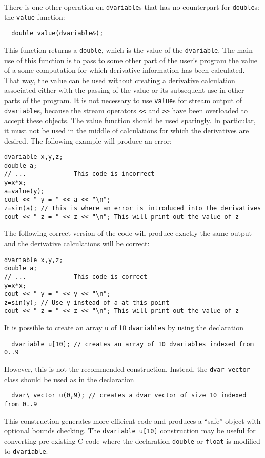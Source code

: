 \documentclass{admbmanual}
\begin{document}
There is one other operation on \texttt{dvariable}s that has no counterpart for
\texttt{double}s: the
\texttt{value} function:
\begin{lstlisting}
  double value(dvariable&);
\end{lstlisting}
\noindent This function returns a \texttt{double}, which is the value of the
\texttt{dvariable}. The main use of this function is to pass to some other part
of the user's program the value of a some computation for which derivative
information has been calculated. That way, the value can be used without
creating a derivative calculation associated either with the passing of the
value or its subsequent use in other parts of the program. It is not necessary
to use \texttt{value}s for stream output of \texttt{dvariable}s, because the
stream operators \texttt{<{}<} and \texttt{>{}>} have been overloaded to accept
these objects. The value function should be used sparingly. In particular, it
must not be used in the middle of calculations for which the derivatives are
desired. The following example will produce an error:
\begin{lstlisting}
dvariable x,y,z;
double a;
// ...             This code is incorrect
y=x*x;
a=value(y);
cout << " y = " << a << "\n";
z=sin(a); // This is where an error is introduced into the derivatives
cout << " z = " << z << "\n"; This will print out the value of z
\end{lstlisting}

The following correct version of the code will produce exactly the same output
and the derivative calculations will be correct:
\begin{lstlisting}
dvariable x,y,z;
double a;
// ...             This code is correct
y=x*x;
cout << " y = " << y << "\n";
z=sin(y); // Use y instead of a at this point
cout << " z = " << z << "\n"; This will print out the value of z
\end{lstlisting}

It is possible to create an array \texttt{u} of 10 \texttt{dvariables} by using
the declaration 
\begin{lstlisting}
  dvariable u[10]; // creates an array of 10 dvariables indexed from 0..9
\end{lstlisting}

However, this is not the recommended construction. Instead, the
\texttt{dvar\_vector} class should be used as in the declaration
\begin{lstlisting}
  dvar\_vector u(0,9); // creates a dvar_vector of size 10 indexed from 0..9
\end{lstlisting}
This construction generates more efficient code and produces a ``safe'' object
with optional bounds checking. The \texttt{dvariable u[10]} construction may be
useful for converting pre-existing C code where the declaration \texttt{double}
or \texttt{float} is modified to \texttt{dvariable}.
\end{document}
